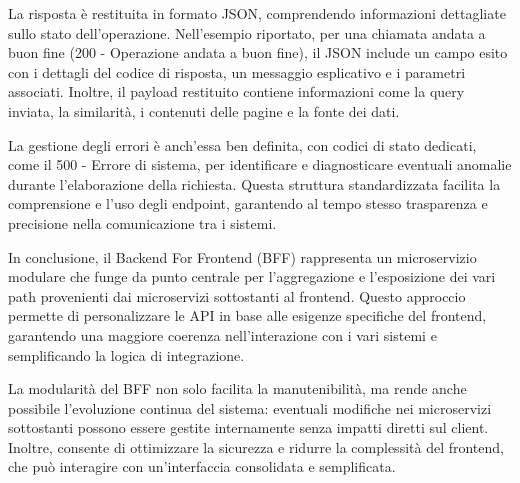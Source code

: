 \documentclass[a4paper,twoside,12pt]{toptesi}
\begin{document}
La risposta è restituita in formato JSON, comprendendo informazioni dettagliate sullo stato dell'operazione. Nell’esempio riportato, per una chiamata andata a buon fine (200 - Operazione andata a buon fine), il JSON include un campo esito con i dettagli del codice di risposta, un messaggio esplicativo e i parametri associati. Inoltre, il payload restituito contiene informazioni come la query inviata, la similarità, i contenuti delle pagine e la fonte dei dati.

La gestione degli errori è anch’essa ben definita, con codici di stato dedicati, come il 500 - Errore di sistema, per identificare e diagnosticare eventuali anomalie durante l’elaborazione della richiesta. Questa struttura standardizzata facilita la comprensione e l’uso degli endpoint, garantendo al tempo stesso trasparenza e precisione nella comunicazione tra i sistemi.


In conclusione, il Backend For Frontend (BFF) rappresenta un microservizio modulare che funge da punto centrale per l'aggregazione e l'esposizione dei vari path provenienti dai microservizi sottostanti al frontend. Questo approccio permette di personalizzare le API in base alle esigenze specifiche del frontend, garantendo una maggiore coerenza nell'interazione con i vari sistemi e semplificando la logica di integrazione.

La modularità del BFF non solo facilita la manutenibilità, ma rende anche possibile l'evoluzione continua del sistema: eventuali modifiche nei microservizi sottostanti possono essere gestite internamente senza impatti diretti sul client. Inoltre, consente di ottimizzare la sicurezza e ridurre la complessità del frontend, che può interagire con un'interfaccia consolidata e semplificata.
\end{document}
